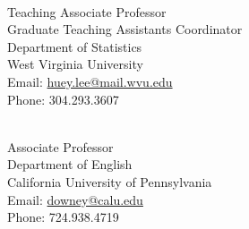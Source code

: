 \documentclass[letterpaper]{deedy-resume} %
\begin{document}
\vspace{10pt}

\\
Teaching Associate Professor\\
Graduate Teaching Assistants Coordinator\\
Department of Statistics\\
West Virginia University\\
Email: \href{mailto:huey.lee@mail.wvu.edu}{huey.lee@mail.wvu.edu}\\
Phone: 304.293.3607 \\

\vspace{10pt}

\\
Associate Professor\\
Department of English\\
California University of Pennsylvania\\
Email: \href{mailto:downey@calu.edu}{downey@calu.edu}\\
Phone: 724.938.4719
\end{document}
